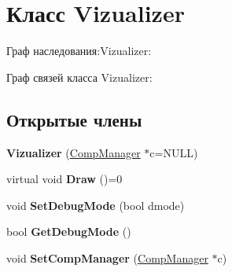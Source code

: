 \hypertarget{class_vizualizer}{
\section{Класс Vizualizer}
\label{class_vizualizer}
}


Граф наследования:Vizualizer:


Граф связей класса Vizualizer:
\subsection*{Открытые члены}
\begin{DoxyCompactItemize}
\item 
\hypertarget{class_vizualizer_a4222ebf88330a369a1c917327008e942}{
{\bfseries Vizualizer} (\hyperlink{class_comp_manager}{CompManager} $\ast$c=NULL)}
\label{class_vizualizer_a4222ebf88330a369a1c917327008e942}

\item 
\hypertarget{class_vizualizer_a567375b467347612087428f0af1a85c7}{
virtual void {\bfseries Draw} ()=0}
\label{class_vizualizer_a567375b467347612087428f0af1a85c7}

\item 
\hypertarget{class_vizualizer_afaef7ec6182ced2bfb9778381eda6762}{
void {\bfseries SetDebugMode} (bool dmode)}
\label{class_vizualizer_afaef7ec6182ced2bfb9778381eda6762}

\item 
\hypertarget{class_vizualizer_a051f95d87c978ea2f69eeebfe0ca9d96}{
bool {\bfseries GetDebugMode} ()}
\label{class_vizualizer_a051f95d87c978ea2f69eeebfe0ca9d96}

\item 
\hypertarget{class_vizualizer_a3f00992794b6ce34805f79c0607c428d}{
void {\bfseries SetCompManager} (\hyperlink{class_comp_manager}{CompManager} $\ast$c)}
\label{class_vizualizer_a3f00992794b6ce34805f79c0607c428d}

\end{DoxyCompactItemize}
